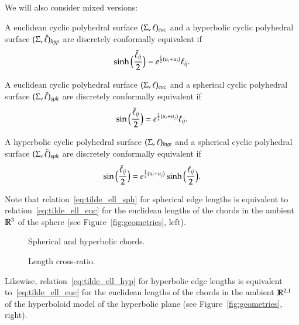\documentclass[Thesis]{subfiles}
\begin{document}
\begin{definition}
We will also consider mixed versions: 
\begin{compactitem}
\item A euclidean cyclic polyhedral surface $(\Sigma,\ell)_{\euc}$ and a
  hyperbolic cyclic polyhedral surface $(\Sigma,\tilde{\ell})_{\mathit{hyp}}$ are
  discretely conformally equivalent if
  \begin{equation}
    \label{eq:tilde_ell_hyp_euc}
    \sinh\Big(\frac{\tilde{\ell}_\mathit{ij}}{2}\Big)
    = e^{\frac{1}{2}(u_{i}+u_{j})}\ell_\mathit{ij}.
  \end{equation}
\item A euclidean cyclic polyhedral surface $(\Sigma,\ell)_{\euc}$ and a spherical cyclic
  polyhedral surface $(\Sigma,\tilde{\ell})_{\mathit{sph}}$ are discretely conformally
  equivalent if
  \begin{equation}\label{eq:tilde_ell_sph_euc}
    \sin\Big(\frac{\tilde{\ell}_\mathit{ij}}{2}\Big)
    = e^{\frac{1}{2}(u_{i}+u_{j})}\ell_\mathit{ij}.
  \end{equation}
\item A hyperbolic cyclic polyhedral surface $(\Sigma,\ell)_{\mathit{hyp}}$ and a spherical cyclic
  polyhedral surface $(\Sigma,\tilde{\ell})_{\mathit{sph}}$ are discretely conformally
  equivalent if
  \begin{equation}\label{eq:tilde_ell_sph_hyp}
    \sin\Big(\frac{\tilde{\ell}_\mathit{ij}}{2}\Big)
    = e^{\frac{1}{2}(u_{i}+u_{j})}\sinh\Big(\frac{\ell_\mathit{ij}}{2}\Big).
  \end{equation}
\end{compactitem}
\end{definition}

\begin{remark}
  \label{rem:chords}
  Note that relation~\eqref{eq:tilde_ell_sph} for spherical edge
  lengths is equivalent to relation~\eqref{eq:tilde_ell_euc} for the
  euclidean lengths of the chords in the ambient $\mathbb R^{3}$ of the
  sphere (see Figure~\ref{fig:geometries}, left).
  \begin{figure}
    \begin{minipage}[b]{0.6\linewidth}
      \centering \resizebox{\textwidth}{!}{
        
         }
      \caption{Spherical and hyperbolic chords.}
      \label{fig:geometries}
    \end{minipage}
    \hfill
    \begin{minipage}[b]{0.33\linewidth}
      \centering
      
      \caption{Length cross-ratio.}
      \label{fig:lcr}
    \end{minipage}
  \end{figure}
  Likewise, relation~\eqref{eq:tilde_ell_hyp} for hyperbolic edge
  lengths is equivalent to~\eqref{eq:tilde_ell_euc} for the euclidean
  lengths of the chords in the ambient $\mathbb R^{2,1}$ of the hyperboloid
  model of the hyperbolic plane (see Figure~\ref{fig:geometries},
  right).
\end{remark}
\end{document}
